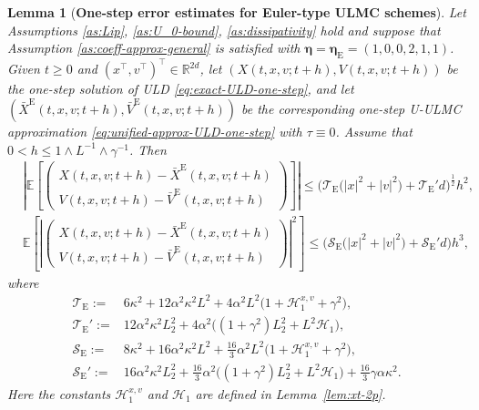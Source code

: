 \documentclass[12pt]{article}
\newenvironment{redtext}
  {\color{black}\ignorespaces}
  {\ignorespacesafterend}
\numberwithin{equation}{section}
\newcommand{\E}{\mathbb{E}}
\newtheorem{lem}{Lemma}[section]
\begin{document}
\begin{redtext}
\begin{lem}[\textbf{One-step error estimates for Euler-type ULMC schemes}]
\label{lem:one-step-weak-strong-error-Euler}
Let Assumptions \ref{as:Lip}, \ref{as:U_0-bound},
\ref{as:dissipativity} hold and suppose that Assumption  \ref{as:coeff-approx-general} is satisfied with
\(
\boldsymbol{\eta}=\boldsymbol{\eta}_{\mathrm E}
=(1,0,0,2,1,1)
\).
Given $t\geq0$ and
$(x^\top,v^\top)^\top\in\mathbb R^{2d}$, let
$(X(t,x,v;t+h),V(t,x,v;t+h))$ be the one-step solution of
ULD \eqref{eq:exact-ULD-one-step}, and let
$(\bar X^{\mathrm E}(t,x,v;t+h),
\bar V^{\mathrm E}(t,x,v;t+h))$ be the corresponding one-step
U-ULMC approximation \eqref{eq:unified-approx-ULD-one-step} with
$\tau\equiv0$.
Assume that
$0<h\leq1\wedge L^{-1}\wedge\gamma^{-1}$.
Then
\begin{align}
&
\left|
\E
\left[
\left(
\begin{aligned}
X(t,x,v;t+h)-\bar X^{\mathrm E}(t,x,v;t+h)
\\
V(t,x,v;t+h)-\bar V^{\mathrm E}(t,x,v;t+h)
\end{aligned}
\right)
\right]
\right|
\leq
\Big(
\mathcal T_{\mathrm E}
\big(
|x|^2+|v|^2
\big)
+
\mathcal T_{\mathrm E}'d
\Big)^{\frac12}
h^2,
\label{eq:one-step-weak-error-Euler}
\\
&
\E
\left[
\left|
\left(
\begin{aligned}
X(t,x,v;t+h)-\bar X^{\mathrm E}(t,x,v;t+h)
\\
V(t,x,v;t+h)-\bar V^{\mathrm E}(t,x,v;t+h)
\end{aligned}
\right)
\right|^2
\right]
\leq
\Big(
\mathcal S_{\mathrm E}
\big(
|x|^2+|v|^2
\big)
+
\mathcal S_{\mathrm E}'d
\Big)
h^3,
\label{eq:one-step-strong-error-Euler}
\end{align}
where
\begin{align}
\mathcal T_{\mathrm E}
:={}&
6\kappa^2
+
12\alpha^2\kappa^2L^2
+
4\alpha^2L^2
\big(
1+\mathscr H_1^{x,v}+\gamma^2
\big),
\nonumber\\
\mathcal T_{\mathrm E}'
:={}&
12\alpha^2\kappa^2L_2^2
+
4\alpha^2
\Big(
(1+\gamma^2)L_2^2
+
L^2\mathscr H_1
\Big),
\nonumber\\
\mathcal S_{\mathrm E}
:={}&
8\kappa^2
+
16\alpha^2\kappa^2L^2
+
\tfrac{16}{3}\alpha^2L^2
\big(
1+\mathscr H_1^{x,v}+\gamma^2
\big),
\nonumber\\
\mathcal S_{\mathrm E}'
:={}&
16\alpha^2\kappa^2L_2^2
+
\tfrac{16}{3}\alpha^2
\Big(
(1+\gamma^2)L_2^2
+
L^2\mathscr H_1
\Big)
+
\tfrac{16}{3}\gamma\alpha\kappa^2.
\label{eq:Euler-local-error-constants}
\end{align}
Here the constants $\mathscr H_1^{x,v}$ and $\mathscr H_1$ are
defined in Lemma~\ref{lem:xt-2p}.
\end{lem}


\end{redtext}
\end{document}
